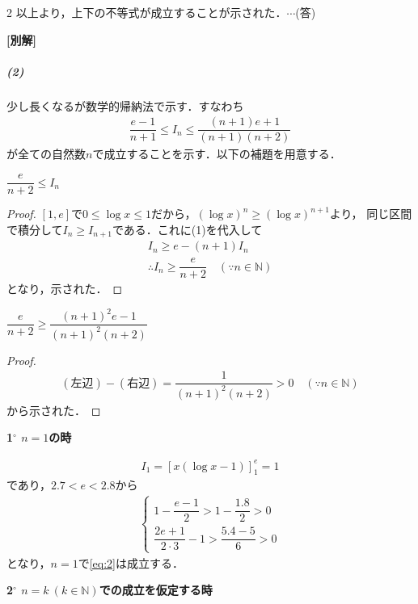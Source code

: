 \documentclass[../../main.tex]{subfiles}
\begin{document}
\begin{multicols}{2}
  以上より，上下の不等式が成立することが示された．$\cdots$(答)

  {\bf [別解]}

  \subparagraph{(2)}
  少し長くなるが数学的帰納法で示す．すなわち
  \begin{align}
    \dfrac{e-1}{n+1} \le I_n \le \dfrac{(n+1)e+1}{(n+1)(n+2)} \label{eq:2}
  \end{align}
  が全ての自然数$n$で成立することを示す．以下の補題を用意する．

  \begin{lemma}
    $\dfrac{e}{n+2} \le I_n$
  \end{lemma}

  \begin{proof}
    $[1,e]$で$0 \le \log x \le 1$だから，$(\log x)^n \ge (\log x)^{n+1}$より，
    同じ区間で積分して$I_n \ge I_{n+1}$である．これに(1)を代入して
    \begin{align}
      I_n \ge e-(n+1)I_n \\
      \therefore I_n \ge \dfrac{e}{n+2} \quad (\because n \in \mathbb{N})
    \end{align}
    となり，示された．
  \end{proof}

  \begin{lemma}
    $\dfrac{e}{n+2} \ge \dfrac{(n+1)^2e-1}{(n+1)^2(n+2)}$
  \end{lemma}

  \begin{proof}
    \begin{align}
      (\text{左辺})-(\text{右辺}) = \dfrac{1}{(n+1)^2(n+2)} > 0 \quad (\because n \in \mathbb{N})
    \end{align}
    から示された．
  \end{proof}

  \textbf{1$^\circ$ $n=1$の時}

  \begin{align}
    I_1 = \left[ x(\log x - 1) \right]_{1}^{e} = 1
  \end{align}
  であり，$2.7<e<2.8$から
  \begin{align}
    \begin{cases}
      1 - \dfrac{e-1}{2}          > 1 - \dfrac{1.8}{2} > 0 \\
      \dfrac{2e+1}{2 \cdot 3} - 1 > \dfrac{5.4-5}{6} > 0
    \end{cases}
  \end{align}
  となり，$n=1$で\cref{eq:2}は成立する．

  \textbf{2$^\circ$ $n=k \ (k \in \mathbb{N})$での成立を仮定する時}


\end{multicols}
\end{document}
